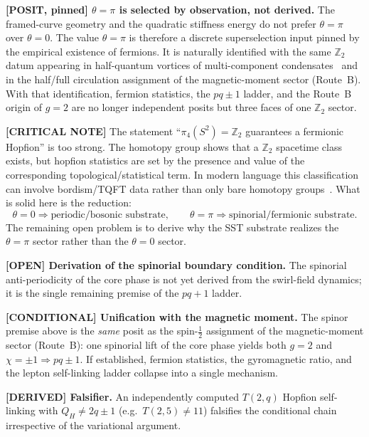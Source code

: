 \documentclass[11pt]{article}
\theoremstyle{definition}
\theoremstyle{plain}
\theoremstyle{remark}
\begin{document}
        \textbf{[POSIT, pinned] $\theta=\pi$ is selected by observation, not derived.}
        The framed-curve geometry and the quadratic stiffness energy do not prefer
        $\theta=\pi$ over $\theta=0$.  The value $\theta=\pi$ is therefore a discrete
        superselection input pinned by the empirical existence of fermions.  It is naturally
        identified with the same $\mathbb{Z}_2$ datum appearing in half-quantum vortices of
        multi-component condensates~\cite{Volovik2003,Autti2016} and in the half/full
        circulation assignment of the magnetic-moment sector (Route~B).  With that
        identification, fermion statistics, the $pq\pm1$ ladder, and the Route~B origin of
        $g=2$ are no longer independent posits but three faces of one $\mathbb{Z}_2$ sector.

        \textbf{[CRITICAL NOTE]}
        The statement ``$\pi_4(S^2)=\mathbb{Z}_2$ guarantees a fermionic Hopfion'' is too strong.
        The homotopy group shows that a $\mathbb{Z}_2$ spacetime class exists, but hopfion
        statistics are set by the presence and value of the corresponding topological/statistical
        term.  In modern language this classification can involve bordism/TQFT data rather than
        only bare homotopy groups~\cite{ChenTanizaki2023}.  What is solid here is the reduction:
        \begin{equation}
            \theta=0 \Rightarrow \text{periodic/bosonic substrate},\qquad
            \theta=\pi \Rightarrow \text{spinorial/fermionic substrate}.
        \end{equation}
        The remaining open problem is to derive why the SST substrate realizes the
        $\theta=\pi$ sector rather than the $\theta=0$ sector.

        \textbf{[OPEN] Derivation of the spinorial boundary condition.}
        The spinorial anti-periodicity of the core phase is not yet derived from the swirl-field
        dynamics; it is the single remaining premise of the $pq+1$ ladder.

        \textbf{[CONDITIONAL] Unification with the magnetic moment.}
        The spinor premise above is the \emph{same} posit as the spin-$\tfrac12$ assignment of
        the magnetic-moment sector (Route~B): one spinorial lift of the core phase yields both
        $g=2$ and $\chi=\pm1\Rightarrow pq\pm1$. If established, fermion statistics, the
        gyromagnetic ratio, and the lepton self-linking ladder collapse into a single mechanism.

        \textbf{[DERIVED] Falsifier.}
        An independently computed $T(2,q)$ Hopfion self-linking with $Q_H\neq 2q\pm1$ (e.g.\
        $T(2,5)\neq 11$) falsifies the conditional chain irrespective of the variational
        argument.
\end{document}
